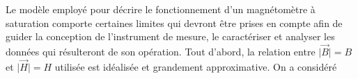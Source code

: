 \documentclass{standalone}
\author{Bastien Gauthier-Soumis,\\
 Edward Halle-Hannan, ,\\
Massine Kadi, ,\\
Félix Pelletier, }
\begin{document}
Le modèle employé pour décrire le fonctionnement d'un magnétomètre à saturation comporte certaines limites qui devront être prises en compte afin de guider la conception de l'instrument de mesure, le caractériser et analyser les données qui résulteront de son opération. Tout d'abord, la relation entre $\vert\vec{B}\vert=B$ et $\vert\vec{H}\vert=H$ utilisée est idéalisée et grandement approximative. On a considéré 
\begin{equation*}
\end{equation*}
\end{document}
